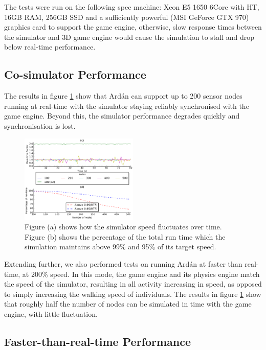 The tests were run on the following spec machine: Xeon E5 1650 6Core with HT, 16GB RAM, 256GB SSD and a sufficiently powerful (MSI GeForce GTX 970) graphics card to support the game engine, otherwise, slow response times between the simulator and 3D game engine would cause the simulation to stall and drop below real-time performance.

\subsection{Co-simulator Performance} %
\label{sub:co_simulator_performance}

The results in figure \ref{fig:simulator_scalability} show that Ard\'{a}n can support up to 200 sensor nodes running at real-time with the simulator staying reliably synchronised with the game engine. Beyond this, the simulator performance degrades quickly and synchronisation is lost.

\begin{figure}[ht]
  \includegraphics[width=0.5\textwidth]{plots/plot2.pdf}
  \caption{Figure (a) shows how the simulator speed fluctuates over time. Figure (b) shows the percentage of the total run time which the simulation maintains above 99\% and 95\% of its target speed.}
  \label{fig:simulator_scalability}
\end{figure}

Extending further, we also performed tests on running Ard\'{a}n at faster than real-time, at 200\% speed. In this mode, the game engine and its physics engine match the speed of the simulator, resulting in all activity increasing in speed, as opposed to simply increasing the walking speed of individuals. The results in figure \ref{fig:simulator_scalability} show that roughly half the number of nodes can be simulated in time with the game engine, with little fluctuation.

\subsection{Faster-than-real-time Performance} %
\label{sub:faster_than_real_time_performance}

